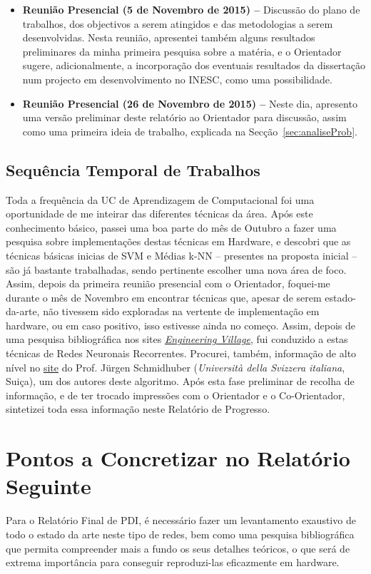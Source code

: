 \documentclass[a4paper, onecolumn, 10pt]{article}
\begin{document}
\begin{itemize}
		\item
			\textbf{Reunião Presencial (5 de Novembro de 2015) --} Discussão do plano de trabalhos, dos objectivos a serem atingidos e das metodologias a serem desenvolvidas. Nesta reunião, apresentei também alguns resultados preliminares da minha primeira pesquisa sobre a matéria, e o Orientador sugere, adicionalmente, a incorporação dos eventuais resultados da dissertação num projecto em desenvolvimento no INESC, como uma possibilidade.

		\item
			\textbf{Reunião Presencial (26 de Novembro de 2015) --} Neste dia, apresento uma versão preliminar deste relatório ao Orientador para discussão, assim como uma primeira ideia de trabalho, explicada na Secção~\ref{sec:analiseProb}.
	\end{itemize}

	\subsection{Sequência Temporal de Trabalhos}
	Toda a frequência da UC de Aprendizagem de Computacional foi uma oportunidade de me inteirar das diferentes técnicas da área. Após este conhecimento básico, passei uma boa parte do mês de Outubro a fazer uma pesquisa sobre implementações destas técnicas em Hardware, e descobri que as técnicas básicas inicias de SVM e Médias k-NN -- presentes na proposta inicial -- são já bastante trabalhadas, sendo pertinente escolher uma nova área de foco.
	Assim, depois da primeira reunião presencial com o Orientador, foquei-me durante o mês de Novembro em encontrar técnicas que, apesar de serem estado-da-arte, não tivessem sido exploradas na vertente de implementação em hardware, ou em caso positivo, isso estivesse ainda no começo. Assim, depois de uma pesquisa bibliográfica nos sites \href{http://www.engineeringvillage.com/}{\textit{Engineering Village}}, fui conduzido a estas técnicas de Redes Neuronais Recorrentes. Procurei, também, informação de alto nível no \href{http://people.idsia.ch/~juergen/rnn.html}{site} do Prof. Jürgen Schmidhuber (\textit{Università della Svizzera italiana}, Suiça), um dos autores deste algoritmo. Após esta fase preliminar de recolha de informação, e de ter trocado impressões com o Orientador e o Co-Orientador, sintetizei toda essa informação neste Relatório de Progresso.

	\section{Pontos a Concretizar no Relatório Seguinte}
	Para o Relatório Final de PDI, é necessário fazer um levantamento exaustivo de todo o estado da arte neste tipo de redes, bem como uma pesquisa bibliográfica que permita compreender mais a fundo os seus detalhes teóricos, o que será de extrema importância para conseguir reproduzi-las eficazmente em hardware.
\end{document}
